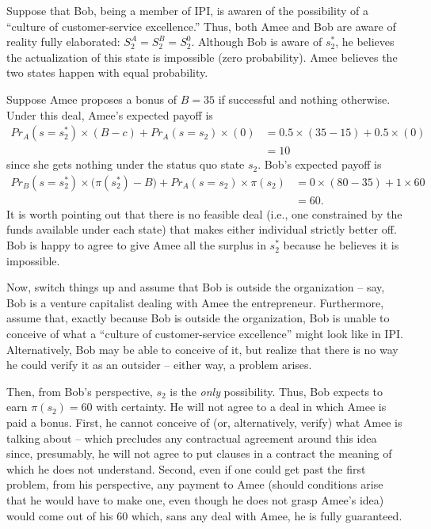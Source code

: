 \documentclass[
11pt,
titlepage,
reqno,
]{article}%
\theoremstyle{definition}
\begin{document}
Suppose that Bob, being a member of IPI, is awaren of the possibility of a ``culture of customer-service excellence.'' 
Thus, both Amee and Bob are aware of reality fully elaborated: $S^A_2=S^B_2=S^0_2$. 
Although Bob is aware of $s^\ast_2$, he believes the actualization of this state is impossible (zero probability). 
Amee believes the two states happen with equal probability.

Suppose Amee proposes a bonus of $B=35$ if successful and nothing otherwise. Under this deal, Amee's expected payoff is 
\begin{align*}
	Pr_A(s=s^\ast_2)\times(B-c)+Pr_A(s=s_2)\times(0) 
	&=
	0.5\times(35-15)+0.5\times(0)\\
	&=
	10
\end{align*}
since she gets nothing under the status quo state $s_2$.
Bob's expected payoff is 
\begin{align*}
	Pr_B(s=s^\ast_2)\times\big(\pi(s^\ast_2)-B\big)+Pr_A(s=s_2)\times \pi(s_2)
	&=
	0\times(80-35)+1\times 60\\
	&=
	60.
\end{align*}
It is worth pointing out that there is no feasible deal (i.e., one constrained by the funds available under each state) that makes either individual strictly better off.
Bob is happy to agree to give Amee all the surplus in $s^\ast_2$ because he believes it is impossible. 

Now, switch things up and assume that Bob is outside the organization -- say, Bob is a venture capitalist dealing with Amee the entrepreneur. 
Furthermore, assume that, exactly because Bob is outside the organization, Bob is unable to conceive of what a ``culture of customer-service excellence'' might look like in IPI. 
Alternatively, Bob may be able to conceive of it, but realize that there is no way he could verify it as an outsider -- either way, a problem arises.

Then, from Bob's perspective, $s_2$ is the \textit{only} possibility. 
Thus, Bob expects to earn $\pi(s_2)=60$ with certainty.
He will not agree to a deal in which Amee is paid a bonus. 
First, he cannot conceive of (or, alternatively, verify) what Amee is talking about -- which precludes any contractual agreement around this idea since, presumably, he will not agree to put clauses in a contract the meaning of which he does not understand. 
Second, even if one could get past the first problem, from his perspective, any payment to Amee (should conditions arise that he would have to make one, even though he does not grasp Amee's idea) would come out of his $60$ which, sans any deal with Amee, he is fully guaranteed.
\end{document}
